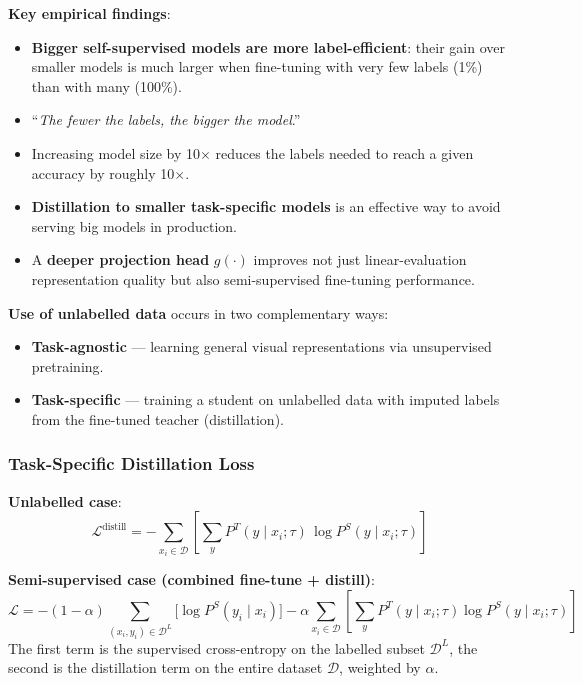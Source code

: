 \documentclass[11pt,a4paper]{article}
\theoremstyle{definition}
\theoremstyle{plain}
\theoremstyle{remark}
\begin{document}
\textbf{Key empirical findings}:
\begin{itemize}
    \item \textbf{Bigger self-supervised models are more label-efficient}: their gain over smaller models is much larger when fine-tuning with very few labels (1\%) than with many (100\%).
    \item ``\emph{The fewer the labels, the bigger the model}.''
    \item Increasing model size by 10$\times$ reduces the labels needed to reach a given accuracy by roughly 10$\times$.
    \item \textbf{Distillation to smaller task-specific models} is an effective way to avoid serving big models in production.
    \item A \textbf{deeper projection head} $g(\cdot)$ improves not just linear-evaluation representation quality but also semi-supervised fine-tuning performance.
\end{itemize}

\textbf{Use of unlabelled data} occurs in two complementary ways:
\begin{itemize}
    \item \textbf{Task-agnostic} --- learning general visual representations via unsupervised pretraining.
    \item \textbf{Task-specific} --- training a student on unlabelled data with imputed labels from the fine-tuned teacher (distillation).
\end{itemize}

\subsubsection{Task-Specific Distillation Loss}

\textbf{Unlabelled case}:
\begin{equation}
    \mathcal{L}^{\text{distill}} = -\sum_{x_i \in \mathcal{D}} \left[ \sum_y P^{T}(y\mid x_i;\tau)\,\log P^{S}(y\mid x_i;\tau) \right]
\end{equation}

\textbf{Semi-supervised case (combined fine-tune + distill)}:
\begin{equation}
    \mathcal{L} = -(1-\alpha)\!\!\sum_{(x_i,y_i)\in\mathcal{D}^{L}}\!\!\big[\log P^{S}(y_i\mid x_i)\big]
    - \alpha \sum_{x_i \in \mathcal{D}} \left[ \sum_y P^{T}(y\mid x_i;\tau) \log P^{S}(y\mid x_i;\tau) \right]
\end{equation}
The first term is the supervised cross-entropy on the labelled subset $\mathcal{D}^{L}$, the second is the distillation term on the entire dataset $\mathcal{D}$, weighted by $\alpha$.
\end{document}
